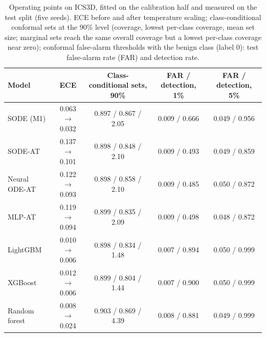 \begin{table}[t]
\caption{Operating points on ICS3D, fitted on the calibration half and measured on
the test split (five seeds). ECE before and after temperature scaling;
class-conditional conformal sets at the 90\% level (coverage, lowest per-class
coverage, mean set size; marginal sets reach the same overall coverage but a
lowest per-class coverage near zero); conformal false-alarm thresholds with the
benign class (label 0): test false-alarm rate (FAR) and detection rate.}
\label{tab:alarms}
\centering\footnotesize
\setlength{\tabcolsep}{3.5pt}
\begin{tabular}{lcccc}
\toprule
Model & ECE & Class-conditional sets, 90\% & FAR / detection, 1\% & FAR / detection, 5\%\\
\midrule
SODE (M1) & 0.063 $\to$ 0.032 & 0.897 / 0.867 / 2.05 & 0.009 / 0.666 & 0.049 / 0.956\\
SODE-AT & 0.137 $\to$ 0.101 & 0.898 / 0.848 / 2.10 & 0.009 / 0.493 & 0.049 / 0.859\\
Neural ODE-AT & 0.122 $\to$ 0.093 & 0.898 / 0.858 / 2.10 & 0.009 / 0.485 & 0.050 / 0.872\\
MLP-AT & 0.119 $\to$ 0.094 & 0.899 / 0.835 / 2.09 & 0.009 / 0.498 & 0.048 / 0.872\\
LightGBM & 0.010 $\to$ 0.006 & 0.898 / 0.834 / 1.48 & 0.007 / 0.894 & 0.050 / 0.999\\
XGBoost & 0.012 $\to$ 0.006 & 0.899 / 0.804 / 1.44 & 0.007 / 0.900 & 0.050 / 0.999\\
Random forest & 0.008 $\to$ 0.024 & 0.903 / 0.869 / 4.39 & 0.008 / 0.881 & 0.049 / 0.999\\
\bottomrule
\end{tabular}
\end{table}






